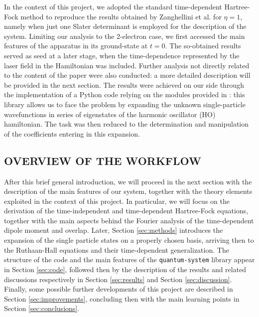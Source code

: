 In the context of this project, we adopted the standard time-dependent Hartree-Fock method to reproduce the results obtained by Zanghellini et al. for $\eta=1$, namely when just one Slater determinant is employed for the description of the system. Limiting our analysis to the 2-electron case, we first accessed the main features of the apparatus in its ground-state at $t=0$. The so-obtained results served as seed at a later stage, when the time-dependence represented by the laser field in the Hamiltonian was included. Further analysis not directly related to the content of the paper were also conducted: a more detailed description will be provided in the next section. The results were achieved on our side through the implementation of a Python code relying on the modules provided in \cite{gitOyvind}: this library allows us to face the problem by expanding the unknown single-particle wavefunctions in series of eigenstates of the harmonic oscillator (HO) hamiltonian. The task was then reduced to the determination and manipulation of the coefficients entering in this expansion.

\subsection{OVERVIEW OF THE WORKFLOW}
After this brief general introduction, we will proceed in the next section with the description of the main features of our system, together with the theory elements exploited in the context of this project. In particular, we will focus on the derivation of the time-independent and time-dependent Hartree-Fock equations, together with the main aspects behind the Fourier analysis of the time-dependent dipole moment and overlap. Later, Section \ref{sec:methods} introduces the expansion of the single particle states on a properly chosen basis, arriving then to the Ruthaan-Hall equations and their time-dependent generalization. The structure of the code and the main features of the \texttt{quantum-system} library appear in Section \ref{sec:code}, followed then by the description of the results and related discussions respectively in Section \ref{sec:results} and Section \ref{sec:discussion}. Finally, some possible further developments of this project are described in Section \ref{sec:improvements}, concluding then with the main learning points in Section \ref{sec:conclusions}.
